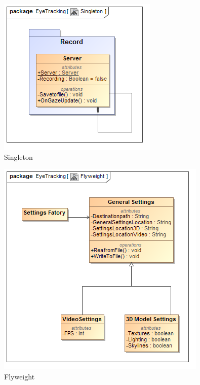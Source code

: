 	\begin{figure}[!ht]
		\centering
		\includegraphics[scale=0.5]{Diagrams/Class_Diagram__Singleton.png}
		\caption{Singleton}
	\end{figure}



\begin{figure}[!ht]
		\centering
		\includegraphics[scale=0.5]{Diagrams/Class_Diagram__Flyweight.png}
		\caption{Flyweight}
	\end{figure}



